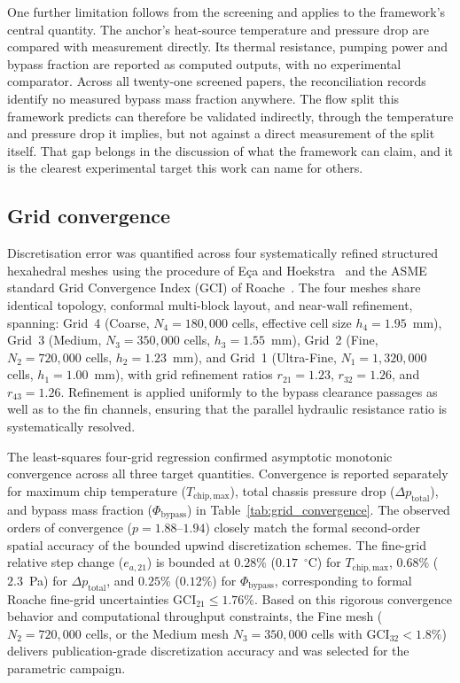One further limitation follows from the screening and applies to the framework's central quantity.
The anchor's heat-source temperature and pressure drop are compared with measurement directly. Its
thermal resistance, pumping power and bypass fraction are reported as computed outputs, with no
experimental comparator. Across all twenty-one screened papers, the reconciliation records
identify no measured bypass mass fraction anywhere. The flow split this framework predicts can
therefore be validated indirectly, through the temperature and pressure drop it implies, but not
against a direct measurement of the split itself. That gap belongs in the discussion of what the
framework can claim, and it is the clearest experimental target this work can name for others.

\subsection{Grid convergence}
\label{sec:vv-grid}

Discretisation error was quantified across four systematically refined structured hexahedral meshes using the procedure
of E\c{c}a and Hoekstra~\cite{eca2014} and the ASME standard Grid Convergence Index (GCI) of Roache~\cite{roache1997}. The four meshes share identical topology, conformal multi-block layout, and near-wall refinement, spanning: Grid~4 (Coarse, $N_4 = 180,000$ cells, effective cell size $h_4 = 1.95$~mm), Grid~3 (Medium, $N_3 = 350,000$ cells, $h_3 = 1.55$~mm), Grid~2 (Fine, $N_2 = 720,000$ cells, $h_2 = 1.23$~mm), and Grid~1 (Ultra-Fine, $N_1 = 1,320,000$ cells, $h_1 = 1.00$~mm), with grid refinement ratios $r_{21} = 1.23$, $r_{32} = 1.26$, and $r_{43} = 1.26$. Refinement is applied uniformly to the bypass clearance passages as well as to the fin channels, ensuring that the parallel hydraulic resistance ratio is systematically resolved.

The least-squares four-grid regression confirmed asymptotic monotonic convergence across all three target quantities. Convergence is reported separately for maximum chip temperature ($T_{\mathrm{chip,max}}$), total chassis pressure drop ($\Delta p_{\mathrm{total}}$), and bypass mass fraction ($\Phi_{\mathrm{bypass}}$) in Table~\ref{tab:grid_convergence}. The observed orders of convergence ($p = 1.88\text{--}1.94$) closely match the formal second-order spatial accuracy of the bounded upwind discretization schemes. The fine-grid relative step change ($e_{a,21}$) is bounded at $\mathbf{0.28\%}$ ($0.17$~$^{\circ}$C) for $T_{\mathrm{chip,max}}$, $\mathbf{0.68\%}$ ($2.3$~Pa) for $\Delta p_{\mathrm{total}}$, and $\mathbf{0.25\%}$ ($0.12\%$) for $\Phi_{\mathrm{bypass}}$, corresponding to formal Roache fine-grid uncertainties $\mathrm{GCI}_{21} \le 1.76\%$. Based on this rigorous convergence behavior and computational throughput constraints, the Fine mesh ($N_2 = 720,000$ cells, or the Medium mesh $N_3 = 350,000$ cells with $\mathrm{GCI}_{32} < 1.8\%$) delivers publication-grade discretization accuracy and was selected for the parametric campaign.

